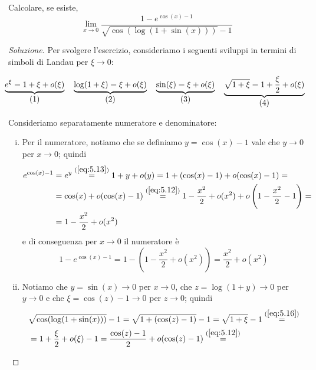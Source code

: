 \begin{exercise}
    \label{ex:5.5}
    Calcolare, se esiste,
    \[
    \lim_{x\to 0} \frac{1-e^{\cos(x)-1}}{\sqrt{\cos(\log(1+\sin(x)))}-1}
    \]
\end{exercise}
\begin{proof}[Soluzione]
    Per svolgere l'esercizio, consideriamo i seguenti sviluppi in termini di simboli di Landau per $\xi \to 0$: 
    \begin{tcolorbox}
    \[
    \!\!\!
    \underbrace{e^\xi= 1+\xi+o(\xi)}_{\stepcounter{equation}\mbox{(\theequation)}} \quad \underbrace{\log(1+\xi) = \xi + o(\xi)}_{\stepcounter{equation}\mbox{(\theequation)}} \quad \underbrace{\sin(\xi) = \xi + o(\xi)}_{\stepcounter{equation}\mbox{(\theequation)}} \quad \underbrace{\sqrt{1+\xi} = 1 + \frac{\xi}{2}+o(\xi)}_{\stepcounter{equation}\mbox{(\theequation)}}
    \]
    \addtocounter{equation}{-4}\label{eq:5.13}
    \addtocounter{equation}{0}\label{eq:5.14}
    \addtocounter{equation}{0}\label{eq:5.15}
    \addtocounter{equation}{0}\label{eq:5.16}
    \end{tcolorbox}
    Consideriamo separatamente numeratore e denominatore:
    \begin{enumerate}[(i)]
        \item Per il numeratore, notiamo che se definiamo $y= \cos(x)-1$ vale che $y\to 0$ per $x\to 0$; quindi
        \[
        \begin{split}
            e^{\cos(x)-1} & = e^y \overset{(\ref{eq:5.13})}{=} 1+y+o(y) = 1 + (\cos(x)-1) + o(\cos(x)-1) = \\
            & = \cos(x)+o(\cos(x)-1) \overset{(\ref{eq:5.12})}{=} 1-\frac{x^2}{2}+o(x^2) + o\left(1-\frac{x^2}{2}-1\right) = \\
            & = 1-\frac{x^2}{2}+o(x^2)
        \end{split}
        \]
        e di conseguenza per $x\to 0$ il numeratore è
        \[
        1-e^{\cos(x)-1} = 1-\left(1-\frac{x^2}{2}+o(x^2)\right) = \frac{x^2}{2} + o(x^2)
        \]
        \item Notiamo che $y=\sin(x)\to0$ per $x\to 0$, che $z = \log(1+y)\to 0$ per $y\to 0$ e che $\xi = \cos(z)-1\to 0$ per $z\to 0$; quindi
        \[
        \begin{split}
            & \sqrt{\cos(\log(1+\sin(x)))}-1 = \sqrt{1+(\cos(z)-1)}-1 = \sqrt{1+\xi} -1\overset{(\ref{eq:5.16})}{=}\\
            & = 1+\frac{\xi}{2} + o(\xi) -1 = \frac{\cos(z)-1}{2} + o(\cos(z)-1) \overset{(\ref{eq:5.12})}{=} \\

\end{split}\]
\end{enumerate}
\end{proof}
